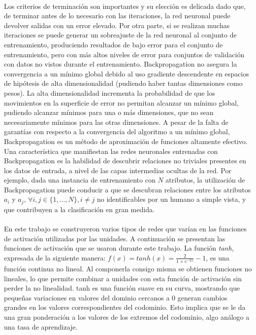 \newpage %

\paragraph{} Los criterios de terminación son importantes y su elección es delicada dado que, de terminar antes de lo necesario con las iteraciones, la red neuronal puede devolver salidas con un error elevado.
Por otra parte, si se realizan muchas iteraciones se puede generar un sobreajuste de la red neuronal al conjunto de entrenamiento, produciendo resultados de bajo error para el conjunto de entrenamiento, pero con más altos niveles de error para conjuntos de validación con datos no vistos durante el entrenamiento.
Backpropagation no asegura la convergencia a un mínimo global debido al uso gradiente descendente en espacios de hipótesis de alta dimensionalidad (pudiendo haber tantas dimensiones como pesos).
La alta dimensionalidad incrementa la probabilidad de que los movimientos en la superficie de error no permitan alcanzar un mínimo global, pudiendo alcanzar mínimos para una o más dimensiones, que no sean necesariamente mínimos para las otras dimensiones.
A pesar de la falta de garantías con respecto a la convergencia del algoritmo a un mínimo global, Backpropagation es un método de aproximación de funciones altamente efectivo.
Una característica que manifiestan las redes neuronales entrenadas con Backpropagation es la habilidad de descubrir relaciones no triviales presentes en los datos de entrada, a nivel de las capas intermedias ocultas de la red.
Por ejemplo, dada una instancia de entrenamiento con $N$ atributos, la utilización de Backpropagation puede conducir a que se descubran relaciones entre los atributos $a_i$ y $a_j$,  $\forall i, j \in \{1, \dots, N\}, i \neq j$ no identificables por un humano a simple vista, y que contribuyen a la clasificación en gran medida.

\paragraph{}En este trabajo se construyeron varios tipos de redes que varían en las funciones de activación utilizadas por las unidades.
A continuación se presentan las funciones de activación que se usaron durante este trabajo. 
La función \textit{tanh}, expresada de la siguiente manera: $f(x) = tanh(x) = \frac{2}{1 + e^{-2x}} - 1 $, es una función continua no lineal.
Al componerla consigo misma se obtienen funciones no lineales, lo que permite combinar a unidades con esta función de activación sin perder la no linealidad. 
tanh es una función suave en su curva, mostrando que pequeñas variaciones en valores del dominio cercanos a 0 generan cambios grandes en los valores correspondientes del codominio.
Esto implica que se le da una gran ponderación a los valores de los extremos del codominio, algo análogo a una tasa de aprendizaje. 

